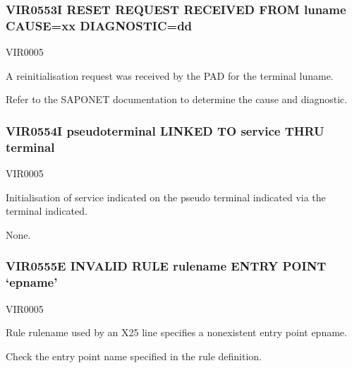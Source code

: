 \documentclass[letterpaper,10pt,english]{sphinxmanual}
\begin{document}
\subsubsection{VIR0553I RESET REQUEST RECEIVED FROM luname CAUSE=xx DIAGNOSTIC=dd}
\label{\detokenize{messages:vir0553i-reset-request-received-from-luname-cause-xx-diagnostic-dd}}\begin{description}
\sphinxAtStartPar
VIR0005

\sphinxAtStartPar
A re\sphinxhyphen{}initialisation request was received by the PAD for the terminal luname.

\sphinxAtStartPar
Refer to the SAPONET documentation to determine the cause and diagnostic.

\end{description}


\subsubsection{VIR0554I pseudo\sphinxhyphen{}terminal LINKED TO service THRU terminal}
\label{\detokenize{messages:vir0554i-pseudo-terminal-linked-to-service-thru-terminal}}\begin{description}
\sphinxAtStartPar
VIR0005

\sphinxAtStartPar
Initialisation of service indicated on the pseudo terminal indicated via the terminal indicated.

\sphinxAtStartPar
None.

\end{description}


\subsubsection{VIR0555E INVALID RULE rulename ENTRY POINT ‘epname’}
\label{\detokenize{messages:vir0555e-invalid-rule-rulename-entry-point-epname}}\begin{description}
\sphinxAtStartPar
VIR0005

\sphinxAtStartPar
Rule rulename used by an X25 line specifies a non\sphinxhyphen{}existent entry point epname.

\sphinxAtStartPar
Check the entry point name specified in the rule definition.

\end{description}
\end{document}
